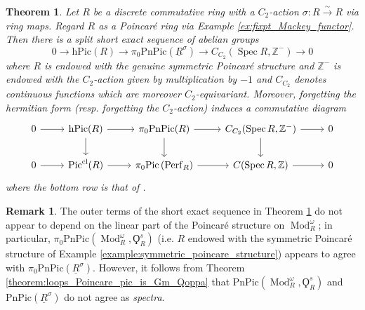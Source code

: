 \documentclass{article}
\DeclareMathOperator{\Spec}{Spec}
\DeclareMathOperator{\Mod}{Mod} %
\newcommand{\ZZ}{\mathbb{Z}}
\newcommand{\pnpic}{\ensuremath{\mathrm{PnPic}}}
\newcommand{\perf}{\mathrm{Perf}}
\newtheorem{theorem}[equation]{Theorem}
\theoremstyle{definition}
\newtheorem{remark}[equation]{Remark}
\begin{document}
\begin{theorem}\label{theorem:Poincare_Pic_of_fixpt_Mackey_functor}
    Let $ R $ be a discrete commutative ring with a $ C_2 $-action $ \sigma \colon R \xrightarrow{\sim} R $ via ring maps. 
    Regard $ R $ as a Poincaré ring via Example \ref{ex:fixpt_Mackey_functor}. 
    Then there is a split short exact sequence of abelian groups
    \begin{equation*}
        0 \to \mathrm{hPic}(R) \to \pi_0\pnpic(\underline{R}^\sigma) \to C_{C_2}(\Spec R, \ZZ^{-}) \to 0
    \end{equation*}
    where $ R $ is endowed with the genuine symmetric Poincaré structure and $ \ZZ^{-} $ is endowed with the $ C_2 $-action given by multiplication by $ -1 $ and $ C_{C_2} $ denotes continuous functions which are moreover $ C_2 $-equivariant. 
    Moreover, forgetting the hermitian form (resp. forgetting the $ C_2 $-action) induces a commutative diagram
    \begin{equation*}
    \begin{tikzcd}
        0 \ar[r] & \mathrm{hPic}(R) \ar[r]\ar[d] & \pi_0\pnpic(R) \ar[r] \ar[d] & C_{C_2}(\Spec R, \ZZ^{-}) \ar[r] \ar[d] & 0 \\
        0 \ar[r] & \mathrm{Pic}^{\mathrm{cl}}(R) \ar[r] & \pi_0 \mathrm{Pic}\left(\perf_R\right) \ar[r] & C(\Spec R, \ZZ) \ar[r] & 0 
    \end{tikzcd}    
    \end{equation*}
    where the bottom row is that of \cite[Theorem 3.5]{MR1966659}. 
\end{theorem}
\begin{remark}
    The outer terms of the short exact sequence in Theorem \ref{theorem:Poincare_Pic_of_fixpt_Mackey_functor} do not appear to depend on the linear part of the Poincar\'e structure on $ \Mod_R^\omega $; in particular, $ \pi_0 \pnpic \left(\Mod_R^\omega,\Qoppa_R^s\right) $ (i.e. $ R $ endowed with the symmetric Poincar\'e structure of Example \ref{example:symmetric_poincare_structure}) appears to agree with $ \pi_0 \pnpic(\underline{R}^\sigma) $. 
    However, it follows from Theorem \ref{theorem:loops_Poincare_pic_is_Gm_Qoppa} that $ \pnpic \left(\Mod_R^\omega,\Qoppa_R^s\right) $ and $ \pnpic(\underline{R}^\sigma) $ do not agree as \emph{spectra}. 
\end{remark}
\end{document}
